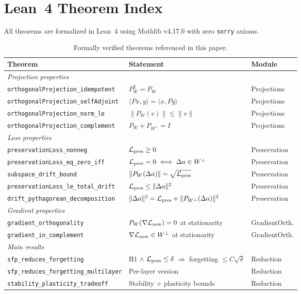 \section{Lean~4 Theorem Index}
\label{sec:lean_index}

All theorems are formalized in Lean~4 using Mathlib v4.17.0 with zero \texttt{sorry} axioms.

\begin{table}[t]
\centering
\small
\caption{Formally verified theorems referenced in this paper.}
\label{tab:lean_index}
\begin{tabular}{p{6.2cm}p{4.8cm}l}
\toprule
Theorem & Statement & Module \\
\midrule
\multicolumn{3}{l}{\textit{Projection properties}} \\
\texttt{orthogonalProjection\_idempotent} & $P_W^2 = P_W$ & Projections \\
\texttt{orthogonalProjection\_selfAdjoint} & $\langle Px,y\rangle = \langle x,Py\rangle$ & Projections \\
\texttt{orthogonalProjection\_norm\_le} & $\|P_W(v)\| \leq \|v\|$ & Projections \\
\texttt{orthogonalProjection\_complement} & $P_W + P_{W^\perp} = I$ & Projections \\
\midrule
\multicolumn{3}{l}{\textit{Loss properties}} \\
\texttt{preservationLoss\_nonneg} & $\mathcal{L}_{\text{pres}} \geq 0$ & Preservation \\
\texttt{preservationLoss\_eq\_zero\_iff} & $\mathcal{L}_{\text{pres}} = 0 \iff \Delta a \in W^\perp$ & Preservation \\
\texttt{subspace\_drift\_bound} & $\|P_W(\Delta a)\| = \sqrt{\mathcal{L}_{\text{pres}}}$ & Preservation \\
\texttt{preservationLoss\_le\_total\_drift} & $\mathcal{L}_{\text{pres}} \leq \|\Delta a\|^2$ & Preservation \\
\texttt{drift\_pythagorean\_decomposition} & $\|\Delta a\|^2 = \mathcal{L}_{\text{pres}} + \|P_{W^\perp}(\Delta a)\|^2$ & Preservation \\
\midrule
\multicolumn{3}{l}{\textit{Gradient properties}} \\
\texttt{gradient\_orthogonality} & $P_W(\nabla \mathcal{L}_{\text{new}}) = 0$ at stationarity & GradientOrth. \\
\texttt{gradient\_in\_complement} & $\nabla \mathcal{L}_{\text{new}} \in W^\perp$ at stationarity & GradientOrth. \\
\midrule
\multicolumn{3}{l}{\textit{Main results}} \\
\texttt{sfp\_reduces\_forgetting} & H1 $\wedge$ $\mathcal{L}_{\text{pres}} \leq \delta$ $\Rightarrow$ forgetting $\leq C\sqrt{\delta}$ & Reduction \\
\texttt{sfp\_reduces\_forgetting\_multilayer} & Per-layer version & Reduction \\
\texttt{stability\_plasticity\_tradeoff} & Stability + plasticity bounds & Reduction \\
\bottomrule
\end{tabular}
\end{table}

